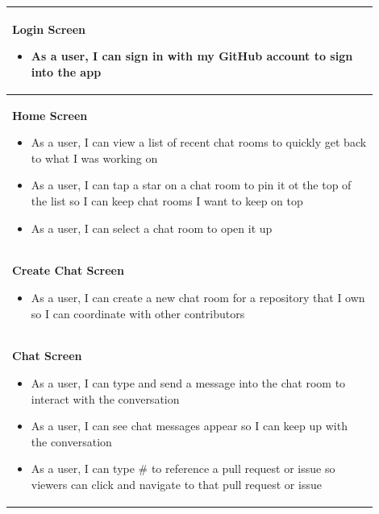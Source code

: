 \documentclass{report}
\begin{document}
\begin{center}
    \begin{tabular}{ | p{0.9\linewidth} |}
        \hline
        \textbf{Login Screen} \begin{itemize}
                                  \item As a user, I can sign in with my GitHub account to sign into the app
                              \end{itemize}                                                        \\
        \hline
        \textbf{Home Screen} \begin{itemize}
                                 \item As a user, I can view a list of recent chat rooms to quickly get back to what I was working on
                                 \item As a user, I can tap a star on a chat room to pin it ot the top of the list so I can keep chat rooms I want to keep on top
                                 \item As a user, I can select a chat room to open it up
                             \end{itemize}   \\
        \hline
        \textbf{Create Chat Screen}\begin{itemize}
                                       \item As a user, I can create a new chat room for a repository that I own so I can coordinate with other contributors
                                   \end{itemize}        \\
        \hline
        \textbf{Chat Screen}\begin{itemize}
                                \item As a user, I can type and send a message into the chat room to interact with the conversation
                                \item As a user, I can see chat messages appear so I can keep up with the conversation
                                \item As a user, I can type \# to reference a pull request or issue so viewers can click and navigate to that pull request or issue


\end{itemize}
\end{tabular}
\end{center}
\end{document}
